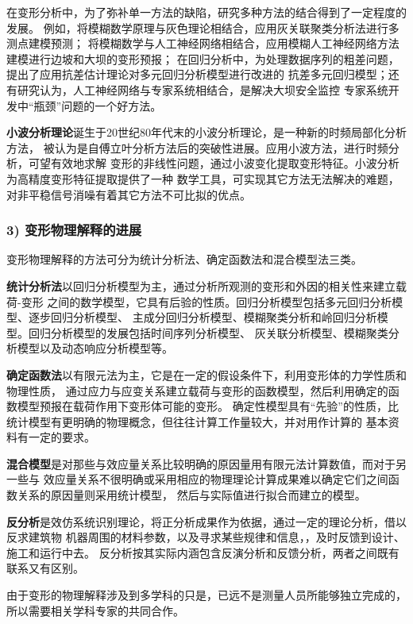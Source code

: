 在变形分析中，为了弥补单一方法的缺陷，研究多种方法的结合得到了一定程度的发展。
例如，将模糊数学原理与灰色理论相结合，应用灰关联聚类分析法进行多测点建模预测；
将模糊数学与人工神经网络相结合，应用模糊人工神经网络方法建模进行边坡和大坝的变形预报；
在回归分析中，为处理数据序列的粗差问题，提出了应用抗差估计理论对多元回归分析模型进行改进的
抗差多元回归模型；还有研究认为，人工神经网络与专家系统相结合，是解决大坝安全监控
专家系统开发中“瓶颈”问题的一个好方法。

\textbf{小波分析理论}诞生于20世纪80年代末的小波分析理论，是一种新的时频局部化分析方法，
被认为是自傅立叶分析方法后的突破性进展。应用小波方法，进行时频分析，可望有效地求解
变形的非线性问题，通过小波变化提取变形特征。小波分析为高精度变形特征提取提供了一种
数学工具，可实现其它方法无法解决的难题，
对非平稳信号消噪有着其它方法不可比拟的优点。

\subsubsection*{3) 变形物理解释的进展}
变形物理解释的方法可分为统计分析法、确定函数法和混合模型法三类。

\textbf{统计分析法}以回归分析模型为主，通过分析所观测的变形和外因的相关性来建立载荷-变形
之间的数学模型，它具有后验的性质。回归分析模型包括多元回归分析模型、逐步回归分析模型、
主成分回归分析模型、模糊聚类分析和岭回归分析模型。回归分析模型的发展包括时间序列分析模型、
灰关联分析模型、模糊聚类分析模型以及动态响应分析模型等。

\textbf{确定函数法}以有限元法为主，它是在一定的假设条件下，利用变形体的力学性质和物理性质，
通过应力与应变关系建立载荷与变形的函数模型，然后利用确定的函数模型预报在载荷作用下变形体可能的变形。
确定性模型具有“先验”的性质，比统计模型有更明确的物理概念，但往往计算工作量较大，并对用作计算的
基本资料有一定的要求。

\textbf{混合模型}是对那些与效应量关系比较明确的原因量用有限元法计算数值，而对于另一些与
效应量关系不很明确或采用相应的物理理论计算成果难以确定它们之间函数关系的原因量则采用统计模型，
然后与实际值进行拟合而建立的模型。

\textbf{反分析}是效仿系统识别理论，将正分析成果作为依据，通过一定的理论分析，借以反求建筑物
机器周围的材料参数，以及寻求某些规律和信息，，及时反馈到设计、施工和运行中去。
反分析按其实际内涵包含反演分析和反馈分析，两者之间既有联系又有区别。

由于变形的物理解释涉及到多学科的只是，已远不是测量人员所能够独立完成的，
所以需要相关学科专家的共同合作。

